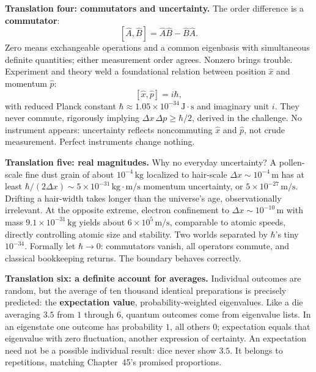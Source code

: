 \textbf{Translation four: commutators and uncertainty.} The order difference is a \textbf{commutator}:
\[
[\hat{A},\hat{B}]=\hat{A}\hat{B}-\hat{B}\hat{A}.
\]
Zero means exchangeable operations and a common eigenbasis with simultaneous definite quantities; either measurement order agrees. Nonzero brings trouble. Experiment and theory weld a foundational relation between position $\hat{x}$ and momentum $\hat{p}$:
\[
[\hat{x},\hat{p}]=i\hbar,
\]
with reduced Planck constant $\hbar\approx1.05\times10^{-34}\,\mathrm{J\cdot s}$ and imaginary unit $i$. They never commute, rigorously implying $\Delta x\,\Delta p\geq\hbar/2$, derived in the challenge. No instrument appears: uncertainty reflects noncommuting $\hat{x}$ and $\hat{p}$, not crude measurement. Perfect instruments change nothing.

\textbf{Translation five: real magnitudes.} Why no everyday uncertainty? A pollen-scale fine dust grain of about $10^{-4}\,\mathrm{kg}$ localized to hair-scale $\Delta x\sim10^{-4}\,\mathrm{m}$ has at least $\hbar/(2\Delta x)\sim5\times10^{-31}\,\mathrm{kg\cdot m/s}$ momentum uncertainty, or $5\times10^{-27}\,\mathrm{m/s}$. Drifting a hair-width takes longer than the universe's age, observationally irrelevant. At the opposite extreme, electron confinement to $\Delta x\sim10^{-10}\,\mathrm{m}$ with mass $9.1\times10^{-31}\,\mathrm{kg}$ yields about $6\times10^{5}\,\mathrm{m/s}$, comparable to atomic speeds, directly controlling atomic size and stability. Two worlds separated by $\hbar$'s tiny $10^{-34}$. Formally let $\hbar\to0$: commutators vanish, all operators commute, and classical bookkeeping returns. The boundary behaves correctly.

\textbf{Translation six: a definite account for averages.} Individual outcomes are random, but the average of ten thousand identical preparations is precisely predicted: the \textbf{expectation value}, probability-weighted eigenvalues. Like a die averaging $3.5$ from $1$ through $6$, quantum outcomes come from eigenvalue lists. In an eigenstate one outcome has probability $1$, all others $0$; expectation equals that eigenvalue with zero fluctuation, another expression of certainty. An expectation need not be a possible individual result: dice never show $3.5$. It belongs to repetitions, matching Chapter~45's promised proportions.

